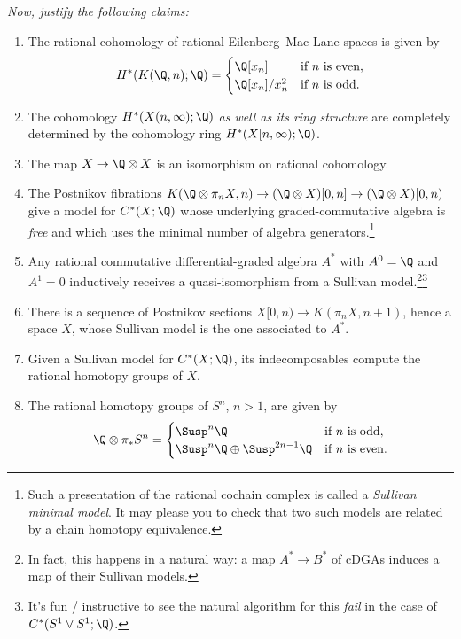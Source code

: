 \begin{problem}
\vspace{\baselineskip}
\noindent \textit{Now, justify the following claims:}
\begin{enumerate}
    \item The rational cohomology of rational Eilenberg--Mac Lane spaces is given by \[H^*(K(\Q, n); \Q) = \begin{cases} \Q[x_n] & \text{if $n$ is even}, \\ \Q[x_n] / x_n^2 & \text{if $n$ is odd}. \end{cases}\]
    \item The cohomology $H^*(X(n, \infty); \Q)$ \emph{as well as its ring structure} are completely determined by the cohomology ring $H^*(X[n, \infty); \Q)$.
    \item The map $X \to \Q \otimes X$ is an isomorphism on rational cohomology.
    \item The Postnikov fibrations $K(\Q \otimes \pi_n X, n) \to (\Q \otimes X)[0, n] \to (\Q \otimes X)[0, n)$ give a model for $C^*(X; \Q)$ whose underlying graded-commutative algebra is \emph{free} and which uses the minimal number of algebra generators.\footnote{Such a presentation of the rational cochain complex is called a \textit{Sullivan minimal model}.  It may please you to check that two such models are related by a chain homotopy equivalence.}
    \item Any rational commutative differential-graded algebra $A^*$ with $A^0 = \Q$ and $A^1 = 0$ inductively receives a quasi-isomorphism from a Sullivan model.\footnote{In fact, this happens in a natural way: a map $A^* \to B^*$ of cDGAs induces a map of their Sullivan models.}\footnote{It's fun / instructive to see the natural algorithm for this \emph{fail} in the case of $C^*(S^1 \vee S^1; \Q)$.}
    \item There is a sequence of Postnikov sections $X[0, n) \to K(\pi_n X, n+1)$, hence a space $X$, whose Sullivan model is the one associated to $A^*$.
    \item Given a Sullivan model for $C^*(X; \Q)$, its indecomposables compute the rational homotopy groups of $X$.
    \item The rational homotopy groups of $S^n$, $n > 1$, are given by \[\Q \otimes \pi_* S^n = \begin{cases} \Susp^n \Q & \text{if $n$ is odd}, \\ \Susp^n \Q \oplus \Susp^{2n-1} \Q & \text{if $n$ is even}. \end{cases}\]
\end{enumerate}
\end{problem}

